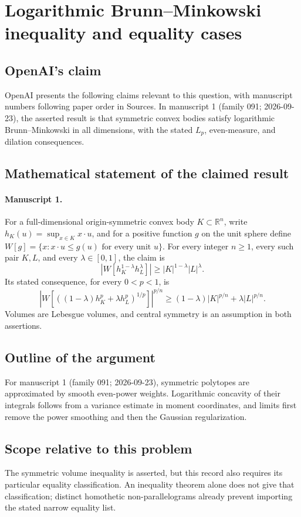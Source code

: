 \documentclass[11pt]{article}
\begin{document}
\section*{Logarithmic Brunn–Minkowski inequality and equality cases}

\subsection{OpenAI's claim}
OpenAI presents the following claims relevant to this question, with manuscript numbers following paper order in Sources. In manuscript 1 (family 091; 2026-09-23), the asserted result is that symmetric convex bodies satisfy logarithmic Brunn--Minkowski in all dimensions, with the stated $L_p$, even-measure, and dilation consequences.

\subsection{Mathematical statement of the claimed result}
\paragraph{Manuscript 1.}
For a full-dimensional origin-symmetric convex body $K\subset\mathbb R^n$, write $h_K(u)=\sup_{x\in K}x\cdot u$, and for a positive function $g$ on the unit sphere define $W[g]=\{x:x\cdot u\le g(u)\text{ for every unit }u\}$. For every integer $n\ge1$, every such pair $K,L$, and every $\lambda\in[0,1]$, the claim is
\[
 |W[h_K^{1-\lambda}h_L^{\lambda}]|\ge |K|^{1-\lambda}|L|^{\lambda}.
\]
Its stated consequence, for every $0<p<1$, is
\[
 \left|W[((1-\lambda)h_K^p+\lambda h_L^p)^{1/p}]\right|^{p/n}
 \ge(1-\lambda)|K|^{p/n}+\lambda|L|^{p/n}.
\]
Volumes are Lebesgue volumes, and central symmetry is an assumption in both assertions.

\subsection{Outline of the argument}
For manuscript 1 (family 091; 2026-09-23), symmetric polytopes are approximated by smooth even-power weights. Logarithmic concavity of their integrals follows from a variance estimate in moment coordinates, and limits first remove the power smoothing and then the Gaussian regularization.

\subsection{Scope relative to this problem}
The symmetric volume inequality is asserted, but this record also requires its particular equality classification. An inequality theorem alone does not give that classification; distinct homothetic non-parallelograms already prevent importing the stated narrow equality list.
\end{document}
